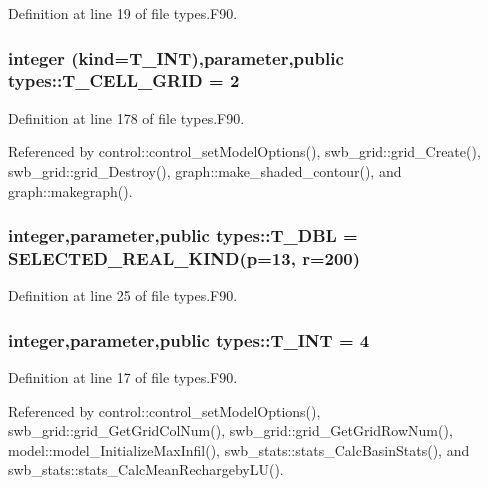 Definition at line 19 of file types.F90.

\hypertarget{namespacetypes_a540676e3b79330fe7fa26455d749cb35}{
\subsubsection[{T\_\-CELL\_\-GRID}]{\setlength{\rightskip}{0pt plus 5cm}integer (kind={\bf T\_\-INT}),parameter,public {\bf types::T\_\-CELL\_\-GRID} = 2}}
\label{namespacetypes_a540676e3b79330fe7fa26455d749cb35}


Definition at line 178 of file types.F90.



Referenced by control::control\_\-setModelOptions(), swb\_\-grid::grid\_\-Create(), swb\_\-grid::grid\_\-Destroy(), graph::make\_\-shaded\_\-contour(), and graph::makegraph().

\hypertarget{namespacetypes_a888737411068474a167b1c3e5b579c58}{
\subsubsection[{T\_\-DBL}]{\setlength{\rightskip}{0pt plus 5cm}integer,parameter,public {\bf types::T\_\-DBL} = SELECTED\_\-REAL\_\-KIND(p=13, r=200)}}
\label{namespacetypes_a888737411068474a167b1c3e5b579c58}


Definition at line 25 of file types.F90.

\hypertarget{namespacetypes_a4e4d040a4425196c4d43be63e7e6103a}{
\subsubsection[{T\_\-INT}]{\setlength{\rightskip}{0pt plus 5cm}integer,parameter,public {\bf types::T\_\-INT} = 4}}
\label{namespacetypes_a4e4d040a4425196c4d43be63e7e6103a}


Definition at line 17 of file types.F90.



Referenced by control::control\_\-setModelOptions(), swb\_\-grid::grid\_\-GetGridColNum(), swb\_\-grid::grid\_\-GetGridRowNum(), model::model\_\-InitializeMaxInfil(), swb\_\-stats::stats\_\-CalcBasinStats(), and swb\_\-stats::stats\_\-CalcMeanRechargebyLU().

